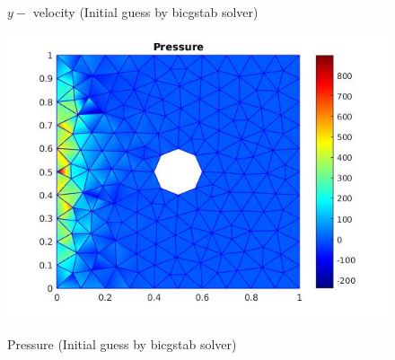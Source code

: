 \documentclass[a4paper]{book}
\begin{document}
\begin{figure}
\begin{minipage}[c]{0.3\textwidth}
    \caption{$y-$ velocity (Initial guess by bicgstab solver)}
  \label{y_vel_navier_stoke_bicgstab}
  \end{minipage}
  \begin{minipage}[c]{0.67\textwidth}
    \includegraphics[width=\textwidth]{cylinder_newton_pressure_bicgstab.jpg}
  \end{minipage}\hfill
  \begin{minipage}[c]{0.3\textwidth}
    \caption{Pressure (Initial guess by bicgstab solver)}
  \label{pressure_navier_stoke_bicgstab}
  \end{minipage}
\caption{\label{flow_over_cylinder_bicgstab_n_s}}
\end{figure}
\end{document}
